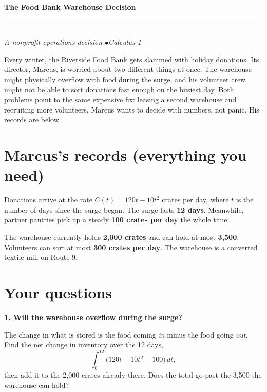\documentclass[11pt]{article}
\newcommand{\question}[1]{\medskip\noindent\textbf{\color{ink}#1}\par\smallskip}
\begin{document}
\begin{center}
{\LARGE\bfseries\color{ink} The Food Bank Warehouse Decision}\\[4pt]
{\color{accent}\rule{2.2in}{1.2pt}}\\[6pt]
{\itshape A nonprofit operations decision \quad$\bullet$\quad Calculus 1}
\end{center}

\vspace{6pt}

Every winter, the Riverside Food Bank gets slammed with holiday donations. Its director, Marcus, is worried about two different things at once. The warehouse might physically overflow with food during the surge, and his volunteer crew might not be able to sort donations fast enough on the busiest day. Both problems point to the same expensive fix: leasing a second warehouse and recruiting more volunteers. Marcus wants to decide with numbers, not panic. His records are below.

\section*{Marcus's records \small\color{gray}(everything you need)}
\vspace{-4pt}

\begin{databox}
\begin{description}[leftmargin=0pt, itemsep=6pt]
\item[The holiday surge.] Donations arrive at the rate $C(t) = 120t - 10t^2$ crates per day, where $t$ is the number of days since the surge began. The surge lasts \textbf{12 days}. Meanwhile, partner pantries pick up a steady \textbf{100 crates per day} the whole time.
\item[Right now.] The warehouse currently holds \textbf{2{,}000 crates} and can hold at most \textbf{3{,}500}. Volunteers can sort at most \textbf{300 crates per day}. The warehouse is a converted textile mill on Route 9.
\end{description}
\end{databox}

\section*{Your questions}

\question{1. Will the warehouse overflow during the surge?}
The change in what is stored is the food coming \emph{in} minus the food going \emph{out}. Find the net change in inventory over the 12 days,
\[
\int_0^{12}\bigl(120t - 10t^2 - 100\bigr)\,dt,
\]
then add it to the 2{,}000 crates already there. Does the total go past the 3{,}500 the warehouse can hold?
\end{document}
